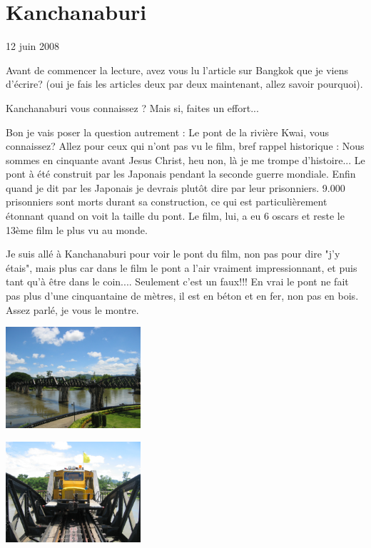 \section{Kanchanaburi}

12 juin 2008

\begin{multicols}{2}

Avant de commencer la lecture, avez vous lu l'article sur Bangkok que je viens d'écrire? (oui je fais les articles deux par deux maintenant, allez savoir pourquoi).

Kanchanaburi vous connaissez ? Mais si, faites un effort...

Bon je vais poser la question autrement : Le pont de la rivière Kwai, vous connaissez? Allez pour ceux qui n'ont pas vu le film, bref rappel historique : Nous sommes en cinquante avant Jesus Christ, heu non, là je me trompe d'histoire... Le pont à été construit par les Japonais pendant la seconde guerre mondiale. Enfin quand je dit par les Japonais je devrais plutôt dire par leur prisonniers. 9.000 prisonniers sont morts durant sa construction, ce qui est particulièrement étonnant quand on voit la taille du pont. Le film, lui, a eu 6 oscars et reste le 13ème film le plus vu au monde.

Je suis allé à Kanchanaburi pour voir le pont du film, non pas pour dire "j'y étais", mais plus car dans le film le pont a l'air vraiment impressionnant, et puis tant qu'à être dans le coin.... Seulement c'est un faux!!! En vrai le pont ne fait pas plus d'une cinquantaine de mètres, il est en béton et en fer, non pas en bois. Assez parlé, je vous le montre.

\smallbreak
\hspace*{-0.65cm}
\includegraphics[width=5cm]{articles/Kanchanaburi/1400.jpg}
\smallbreak

\smallbreak
\hspace*{-0.65cm}
\includegraphics[width=5cm]{articles/Kanchanaburi/1401.jpg}
\smallbreak


\end{multicols}
